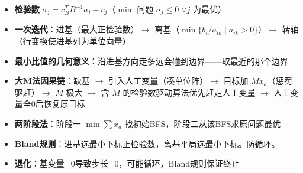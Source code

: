 \begin{itemize}
  \item \textbf{检验数} $\sigma_j = c_B^T B^{-1} a_j - c_j$（$\min$ 问题 $\sigma_j\le 0\;\forall j$ 为最优）
  \item \textbf{一次迭代}：进基（最大正检验数）$\to$ 离基（$\min\{b_i/a_{ik}\mid a_{ik}>0\}$）$\to$ 转轴（行变换使进基列为单位向量）
  \item \textbf{最小比值的几何意义}：沿进基方向走多远会碰到边界——取最近的那个边界
  \item \textbf{大M法因果链}：缺基 $\to$ 引入人工变量（凑单位阵）$\to$ 目标加 $M x_a$（惩罚驱赶）$\to$ $M$ 极大 $\to$ 含 $M$ 的检验数驱动算法优先赶走人工变量 $\to$ 人工变量全0后恢复原目标
  \item \textbf{两阶段法}：阶段一 $\min\sum x_a$ 找初始BFS，阶段二从该BFS求原问题最优
  \item \textbf{Bland规则}：进基选最小下标正检验数，离基平局选最小下标。防循环。
  \item \textbf{退化}：基变量=0导致步长=0，可能循环，Bland规则保证终止
\end{itemize}
